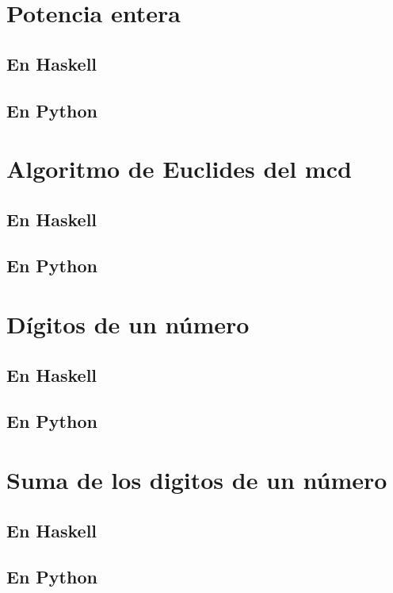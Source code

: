 \documentclass[a4paper,12pt,twoside]{book}
\begin{document}
\minitoc

\section{Potencia entera}
\subsection*{En Haskell}
\subsection*{En Python}

\section{Algoritmo de Euclides del mcd}
\subsection*{En Haskell}
\subsection*{En Python}

\section{Dígitos de un número}
\subsection*{En Haskell}
\subsection*{En Python}

\section{Suma de los digitos de un número}
\subsection*{En Haskell}
\subsection*{En Python}
\end{document}

